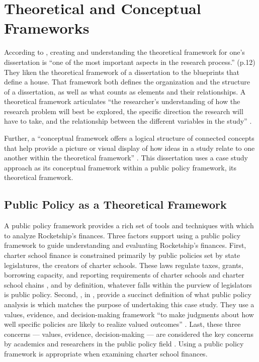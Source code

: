 \section{Theoretical and Conceptual Frameworks}\indent

According to \textcite{Grant.Osanloo2014}, creating and understanding the theoretical framework for one's dissertation is ``one of the most important aspects in the research process.'' (p.12) They liken the theoretical framework of a dissertation to the blueprints that define a house. That framework both defines the organization and the structure of a dissertation, as well as what counts as elements and their relationships. A theoretical framework articulates ``the researcher's understanding of how the research problem will best be explored, the specific direction the research will have to take, and the relationship between the different variables in the study'' \parencite[16–17]{Grant.Osanloo2014}. %

Further, a ``conceptual framework offers a logical structure of connected concepts that help provide a picture or visual display of how ideas in a study relate to one another within the theoretical framework'' \parencite[16–17]{Grant.Osanloo2014}. This dissertation uses a case study approach as its conceptual framework within a public policy framework, its theoretical framework. 

\subsection{Public Policy as a Theoretical Framework}\label{subsec:PublicPolicyFramework}\indent

A public policy framework provides a rich set of tools and techniques with which to analyze Rocketship's finances. Three factors support using a public policy framework to guide understanding and evaluating Rocketship's finances. First, charter school finance is constrained primarily by public policies set by state legislatures, the creators of charter schools. These laws regulate taxes, grants, borrowing capacity, and reporting requirements of charter schools and charter school chains \parencite{Aguinaldo.etal2020}, and by definition, whatever falls within the purview of legislators is public policy. Second, \textcite{Brighouse.etal2018}, in , provide a succinct definition of what public policy analysis is which matches the purpose of undertaking this case study. They use a values, evidence, and decision-making framework ``to make judgments about how well specific policies are likely to realize valued outcomes'' \parencite[p.1]{Brighouse.etal2018}. Last, these three concerns — values, evidence, decision-making — are considered the key concerns by academics and researchers in the public policy field \parencite{BuenoDeMesquita2016, Clemons.McBeth2021,Fowler2013,Gupta2011}. Using a public policy framework is appropriate when examining charter school finances.

